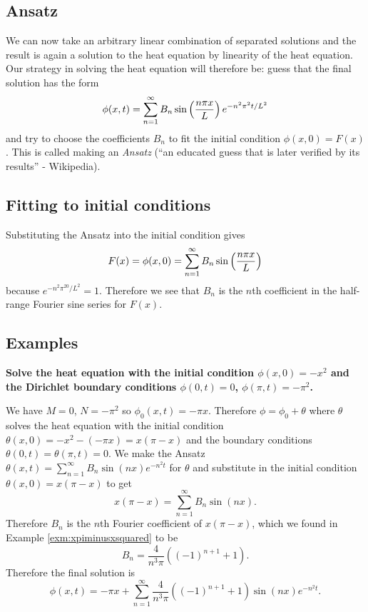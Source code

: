 \subsection{Ansatz}

We can now take an arbitrary linear combination of separated solutions and the result is again a solution to the heat equation by linearity of the heat equation. Our strategy in solving the heat equation will therefore be: guess that the final solution has the form
\[\phi(x,t)=\sum_{n=1}^{\infty}B_n\sin\left(\frac{n \pi x}{L}\right)e^{-n^2\pi^2t/L^2}\]
and try to choose the coefficients $B_n$ to fit the initial condition $\phi(x,0)=F(x)$. This is called making an {\em Ansatz} (``an educated guess that is later verified by its results'' - Wikipedia).

\subsection{Fitting to initial conditions}

Substituting the Ansatz into the initial condition gives
\[F(x)=\phi(x,0)=\sum_{n=1}^{\infty}B_n\sin\left(\frac{n \pi x}{L}\right)\]
because $e^{-n^2\pi^20/L^2}=1$. Therefore we see that $B_n$ is the $n$th coefficient in the half-range Fourier sine series for $F(x)$.

\subsection{Examples}

\begin{exm}
{\bf Solve the heat equation with the initial condition $\phi(x,0)=-x^2$ and the Dirichlet boundary conditions $\phi(0,t)=0$, $\phi(\pi,t)=-\pi^2$.}

We have $M=0$, $N=-\pi^2$ so $\phi_0(x,t)=-\pi x$. Therefore $\phi=\phi_0+\theta$ where $\theta$ solves the heat equation with the initial condition $\theta(x,0)=-x^2-(-\pi x)=x(\pi-x)$ and the boundary conditions $\theta(0,t)=\theta(\pi,t)=0$. We make the Ansatz $\theta(x,t)=\sum_{n=1}^{\infty}B_n\sin(nx)e^{-n^2t}$ for $\theta$ and substitute in the initial condition $\theta(x,0)=x(\pi-x)$ to get
\[x(\pi-x)=\sum_{n=1}^{\infty}B_n\sin(nx).\]
Therefore $B_n$ is the $n$th Fourier coefficient of $x(\pi-x)$, which we found in Example \ref{exm:xpiminusxsquared} to be
\[B_n=\frac{4}{n^3\pi}((-1)^{n+1}+1).\]
Therefore the final solution is
\[\phi(x,t)=-\pi x+\sum_{n=1}^{\infty}\frac{4}{n^3\pi}((-1)^{n+1}+1)\sin(nx)e^{-n^2t}.\]
\end{exm}

